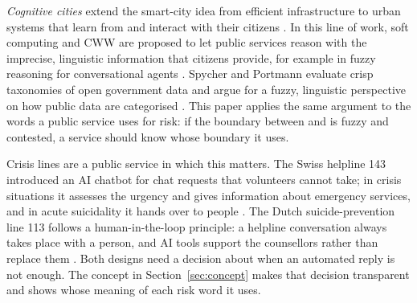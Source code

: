 \emph{Cognitive cities} extend the smart-city idea from efficient infrastructure to urban systems that learn from and
interact with their citizens \citep{finger2016cognitive}.
In this line of work, soft computing and CWW are proposed to let public services reason with the imprecise, linguistic
information that citizens provide, for example in fuzzy reasoning for conversational agents
\citep{donofrio2019fuzzy}.
Spycher and Portmann evaluate crisp taxonomies of open government data and argue for a fuzzy, linguistic perspective
on how public data are categorised \citep{spycher2026crispness}.
This paper applies the same argument to the words a public service uses for risk: if the boundary between
 and  is fuzzy and contested, a service should know whose boundary it uses.

Crisis lines are a public service in which this matters.
The Swiss helpline 143 introduced an AI chatbot for chat requests that volunteers cannot take; in crisis situations it
assesses the urgency and gives information about emergency services, and in acute suicidality it hands over to people
\citep{srf2026dargebotene,keystone2026dargebotene}.
The Dutch suicide-prevention line 113 follows a human-in-the-loop principle: a helpline conversation always takes place
with a person, and AI tools support the counsellors rather than replace them
\citep{zelfmoordpreventie113hulplijn,vu2024aitool}.
Both designs need a decision about when an automated reply is not enough.
The concept in Section~\ref{sec:concept} makes that decision transparent and shows whose meaning of each risk word it
uses.
